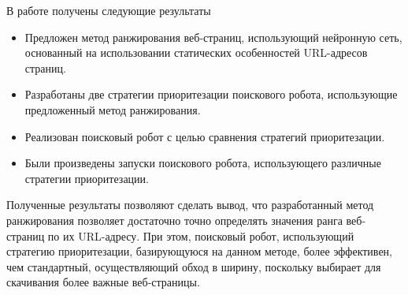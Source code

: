 \startconclusionpage

В работе получены следующие результаты

\begin{itemize}
\item Предложен метод ранжирования веб-страниц, использующий нейронную сеть, основанный на использовании статических особенностей URL-адресов страниц.
\item Разработаны две стратегии приоритезации поискового робота, использующие предложенный метод ранжирования.
\item Реализован поисковый робот с целью сравнения стратегий приоритезации.
\item Были произведены запуски поискового робота, использующего различные стратегии приоритезации.
\end{itemize}

Полученные результаты позволяют сделать вывод, что разработанный метод ранжирования позволяет достаточно точно определять значения ранга веб-страниц по их URL-адресу. При этом, поисковый робот, использующий стратегию приоритезации, базирующуюся на данном методе, более эффективен, чем стандартный, осуществляющий обход в ширину, поскольку выбирает для скачивания более важные веб-страницы.